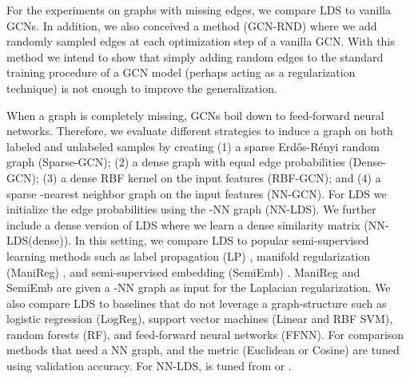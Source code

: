 \documentclass{article}
\newcommand{\lds}{\textsc{LDS}\xspace}
\begin{document}
For the experiments on graphs with missing edges, we compare \lds to vanilla GCNs. In addition, we also conceived a method (GCN-RND) where we add randomly sampled edges at each optimization step of a vanilla GCN. With this method we intend to show that simply adding random edges to the standard training procedure of a GCN model (perhaps acting as a regularization technique) is not enough to improve the generalization.


When a graph is completely missing, GCNs boil down to feed-forward neural networks. Therefore, we evaluate different strategies to induce a graph on both labeled and unlabeled samples by creating (1) a sparse Erd\H{o}s-R\'enyi random graph \citep{erdos1960evolution} (Sparse-GCN); (2) a dense graph with equal edge probabilities (Dense-GCN); (3) a dense RBF kernel on the input features (RBF-GCN); and (4) a sparse -nearest neighbor graph on the input features (NN-GCN).
For \lds we initialize the edge probabilities using the -NN graph (NN-\lds). 
We further include a dense version of \lds where we learn a dense similarity matrix 
(NN-\lds (dense)).
In this setting, we compare \lds to popular semi-supervised learning methods such as 
label propagation (LP) \citep{zhu2003semi}, manifold regularization (ManiReg) \citep{belkins206manifold}, and semi-supervised embedding (SemiEmb) \citep{weston2012deep}. 
ManiReg and SemiEmb are given a -NN graph as input for the Laplacian regularization.
We also compare \lds to baselines that do not leverage a graph-structure such as logistic regression (LogReg), support vector machines (Linear and RBF SVM), random forests (RF), and feed-forward neural networks (FFNN). 
For comparison methods that need a NN graph,  and the metric (Euclidean or Cosine) are tuned using validation accuracy. For NN-LDS,  is tuned from  or .
\end{document}
